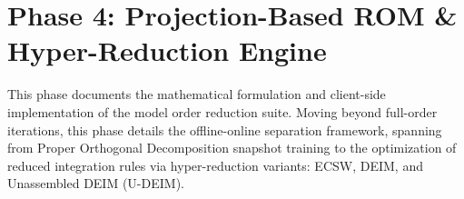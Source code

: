 \section{Phase 4: Projection-Based ROM \& Hyper-Reduction Engine}
\label{sec:phase4}

This phase documents the mathematical formulation and client-side implementation of the model order reduction suite. Moving beyond full-order iterations, this phase details the offline-online separation framework, spanning from Proper Orthogonal Decomposition snapshot training to the optimization of reduced integration rules via hyper-reduction variants: ECSW, DEIM, and Unassembled DEIM (U-DEIM).




